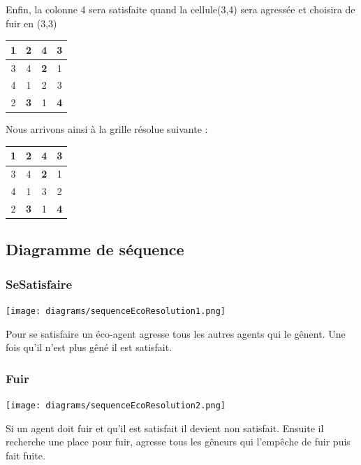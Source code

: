     Enfin, la colonne 4 sera satisfaite quand la cellule(3,4) sera agressée et choisira de fuir en (3,3) \\
    \begin{center}
         \begin{tabular}{|c|c| |c|c| }
               \hline
               \textbf{1}&2&4&3\\
               \hline
               3&4&\textbf{2}&1\\
               \hline
               \hline
               4&1&{\color{green} 2}&{\color{red} 3}\\
               \hline
               2&\textbf{3}&1&\textbf{4}\\                      
            \hline
        \end{tabular}
    \end{center}

	Nous arrivons ainsi à la grille résolue suivante :\\

    	\begin{center}
         \begin{tabular}{|c|c| |c|c| }
               \hline
               \textbf{1}&2&4&3\\
               \hline
               3&4&\textbf{2}&1\\
               \hline
               \hline
               4&1&3&2\\
               \hline
               2&\textbf{3}&1&\textbf{4}\\                      
            \hline
        \end{tabular}
    \end{center}        
    
        \subsection{Diagramme de séquence}
            \subsubsection{SeSatisfaire}
                \begin{center}
                    \texttt{[image: diagrams/sequenceEcoResolution1.png]}
                \end{center} 
                Pour se satisfaire un éco-agent agresse tous les autres agents qui le gênent. Une fois qu'il n'est plus gêné il est satisfait. 
            \subsubsection{Fuir}
                \begin{center}
                    \texttt{[image: diagrams/sequenceEcoResolution2.png]}
                \end{center} 
                Si un agent doit fuir et qu'il est satisfait il devient non satisfait. Ensuite il recherche une place pour fuir, agresse tous les gêneurs qui l'empêche de fuir puis fait fuite. 
